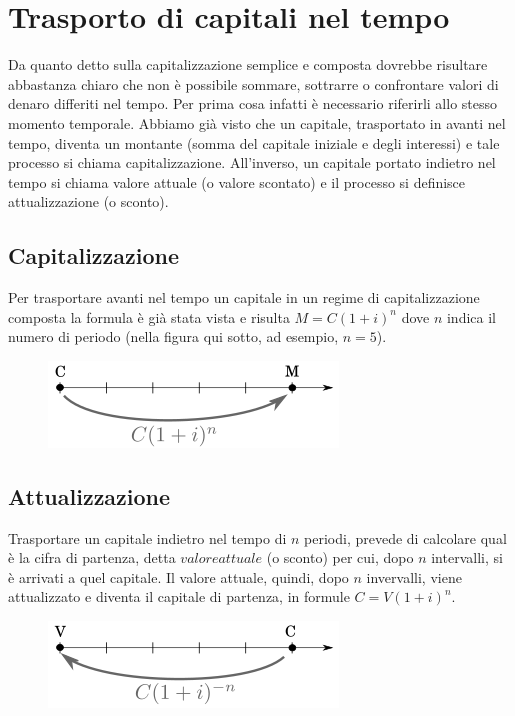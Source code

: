\section{Trasporto di capitali nel tempo}
Da quanto detto sulla capitalizzazione semplice e composta dovrebbe 
risultare abbastanza chiaro che non è possibile sommare, sottrarre o 
confrontare valori di denaro differiti nel tempo. Per prima cosa infatti è 
necessario riferirli allo stesso momento temporale. Abbiamo già visto che 
un capitale, trasportato in avanti nel tempo, diventa un montante (somma 
del capitale iniziale e degli interessi) e tale processo si chiama 
capitalizzazione. All'inverso, un capitale portato indietro nel tempo si 
chiama valore attuale (o valore scontato) e il processo si definisce 
attualizzazione (o sconto). 


\subsection{Capitalizzazione}
Per trasportare avanti nel tempo un capitale in un regime di 
capitalizzazione composta la formula è già stata vista e risulta 
\(M=C(1+i)^n\) dove \(n\) 
indica il numero di periodo (nella figura qui sotto, ad esempio, \(n=5\)).

\begin{figure}[htp]
\centering
\includegraphics[scale=.60]{img/capitalizzazione.png}
\end{figure}

\subsection{Attualizzazione}
Trasportare un capitale indietro nel tempo di \(n\) periodi, prevede di 
calcolare qual è la cifra di partenza, detta \(valore attuale\) (o sconto) 
per cui, dopo \(n\) intervalli, si è arrivati a quel capitale. Il valore 
attuale, quindi, dopo \(n\) invervalli, viene attualizzato e diventa il 
capitale di partenza, in formule \(C=V(1+i)^n\).
\begin{figure}[htp]
\centering
\includegraphics[scale=.60]{img/attualizzazione.png}
\end{figure}

